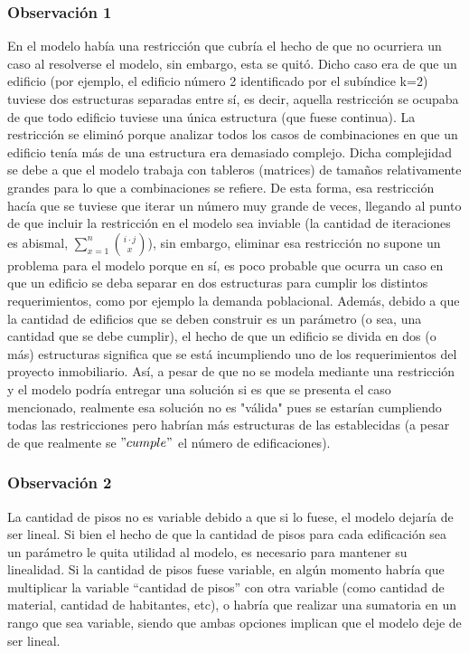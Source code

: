 \documentclass[letterpaper]{article}
\begin{document}
\subsubsection{Observación 1}
\noindent
En el modelo había una restricción que cubría el hecho de que no ocurriera un caso al resolverse el modelo, sin embargo, esta se quitó. Dicho caso era de que un edificio (por ejemplo, el edificio número 2 identificado por el subíndice k=2)
tuviese dos estructuras separadas entre sí, es decir, aquella restricción se ocupaba de que todo edificio tuviese una única estructura (que fuese continua). La restricción se eliminó porque
analizar todos los casos de combinaciones en que un edificio tenía más de una estructura era demasiado complejo. Dicha complejidad se debe a que el modelo
trabaja con tableros (matrices) de tamaños relativamente grandes para lo que a combinaciones se refiere. De esta forma, esa restricción hacía que se tuviese que iterar un número muy grande
de veces, llegando al punto de que incluir la restricción en el modelo sea inviable (la cantidad de iteraciones es abismal, $\displaystyle \sum_{x=1}^{n} \binom{i\cdot j}{x}$), sin embargo, eliminar esa restricción
no supone un problema para el modelo porque en sí, es poco probable que ocurra un caso en que un edificio se deba separar en dos estructuras para cumplir los distintos requerimientos, como por ejemplo
la demanda poblacional. Además, debido a que la cantidad de edificios que se deben construir es un parámetro (o sea, una cantidad que se debe cumplir), el hecho de que un edificio se divida en dos (o más) estructuras
significa que se está incumpliendo uno de los requerimientos del proyecto inmobiliario. Así, a pesar de que no se modela mediante una restricción y el modelo podría
entregar una solución si es que se presenta el caso mencionado, realmente esa solución no es "válida" pues se estarían cumpliendo todas las restricciones pero habrían 
más estructuras de las establecidas (a pesar de que realmente se $"cumple"$ el número de edificaciones).

\subsubsection{Observación 2}
\noindent
La cantidad de pisos no es variable debido a que si lo fuese, el modelo dejaría de ser lineal. Si bien el hecho de que la cantidad de pisos para cada edificación sea un parámetro le quita utilidad al modelo, es necesario para mantener su linealidad.
Si la cantidad de pisos fuese variable, en algún momento habría que multiplicar la variable “cantidad de pisos” con otra variable (como cantidad de material, cantidad de habitantes, etc), o habría que realizar una sumatoria en un rango que sea variable,
siendo que ambas opciones implican que el modelo deje de ser lineal.
\end{document}

